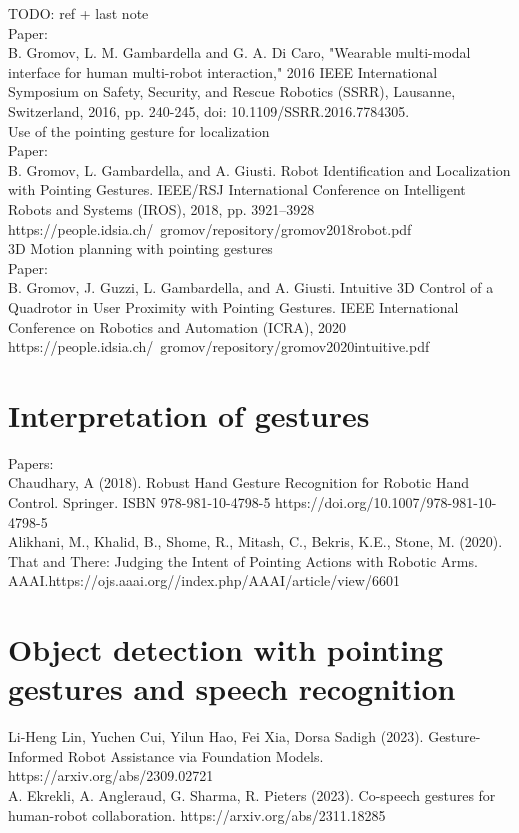 TODO: ref + last note\\

Paper: \\
B. Gromov, L. M. Gambardella and G. A. Di Caro, "Wearable multi-modal interface for human multi-robot interaction," 2016 IEEE International Symposium on Safety, Security, and Rescue Robotics (SSRR), Lausanne, Switzerland, 2016, pp. 240-245, doi: 10.1109/SSRR.2016.7784305.\\

Use of the pointing gesture for localization \\

Paper: \\
B. Gromov, L. Gambardella, and A. Giusti. Robot Identification and Localization with Pointing Gestures. IEEE/RSJ International Conference on Intelligent Robots and Systems (IROS), 2018, pp. 3921–3928 https://people.idsia.ch/~gromov/repository/gromov2018robot.pdf \\

3D Motion planning with pointing gestures \\

Paper: \\
B. Gromov, J. Guzzi, L. Gambardella, and A. Giusti. Intuitive 3D Control of a Quadrotor in User Proximity with Pointing Gestures. IEEE International Conference on Robotics and Automation (ICRA), 2020 https://people.idsia.ch/~gromov/repository/gromov2020intuitive.pdf

\section{Interpretation of gestures}
Papers:\\

Chaudhary, A (2018). Robust Hand Gesture Recognition for Robotic Hand Control. Springer. ISBN 978-981-10-4798-5 https://doi.org/10.1007/978-981-10-4798-5\\

Alikhani, M., Khalid, B., Shome, R., Mitash, C., Bekris, K.E., Stone, M. (2020). That and There: Judging the Intent of Pointing Actions with Robotic Arms. AAAI.https://ojs.aaai.org//index.php/AAAI/article/view/6601\\

\section{Object detection with pointing gestures and speech recognition}
Li-Heng Lin, Yuchen Cui, Yilun Hao, Fei Xia, Dorsa Sadigh (2023). Gesture-Informed Robot Assistance via Foundation Models. https://arxiv.org/abs/2309.02721 \\

A. Ekrekli, A. Angleraud, G. Sharma, R. Pieters (2023). Co-speech gestures for human-robot collaboration. https://arxiv.org/abs/2311.18285 \\



% 

% 

% 
%


